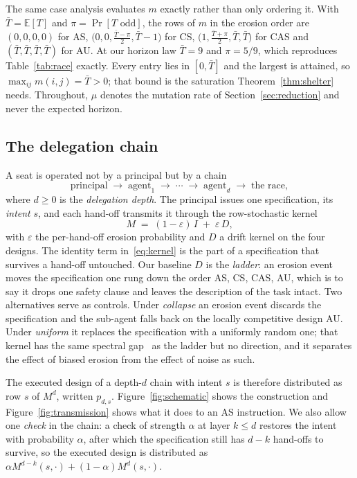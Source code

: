 \documentclass[a4paper,fleqn]{cas-sc}
\newcommand{\AS}{\textsf{AS}}
\newcommand{\CS}{\textsf{CS}}
\newcommand{\CAS}{\textsf{CAS}}
\newcommand{\AU}{\textsf{AU}}
\begin{document}
The same case analysis evaluates $m$ exactly rather than only ordering it. With
$\bar T=\mathbb{E}[T]$ and $\pi=\Pr[T\text{ odd}]$, the rows of $m$ in the
erosion order are $(0,0,0,0)$ for \AS{},
$\bigl(0,0,\tfrac{\bar T-\pi}{2},\bar T-1\bigr)$ for \CS{},
$\bigl(1,\tfrac{\bar T+\pi}{2},\bar T,\bar T\bigr)$ for \CAS{} and
$(\bar T,\bar T,\bar T,\bar T)$ for \AU{}. At our horizon law $\bar T=9$ and
$\pi=5/9$, which reproduces Table~\ref{tab:race} exactly. Every entry lies in
$[0,\bar T]$ and the largest is attained, so $\max_{ij}m(i,j)=\bar T>0$; that
bound is the saturation Theorem~\ref{thm:shelter} needs. Throughout, $\mu$
denotes the mutation rate of Section~\ref{sec:reduction} and never the expected
horizon.

\subsection{The delegation chain}
\label{sec:chain}

A seat is operated not by a principal but by a chain
\[
  \text{principal} \;\longrightarrow\; \text{agent}_1 \;\longrightarrow\;
  \cdots \;\longrightarrow\; \text{agent}_d \;\longrightarrow\; \text{the race},
\]
where $d\ge0$ is the \emph{delegation depth}. The principal issues one
specification, its \emph{intent} $s$, and each hand-off transmits it through
the row-stochastic kernel
\begin{equation}
  M \;=\; (1-\varepsilon)\,I \;+\; \varepsilon\,D,
  \label{eq:kernel}
\end{equation}
with $\varepsilon$ the per-hand-off erosion probability and $D$ a drift kernel
on the four designs. The identity term in~\eqref{eq:kernel} is the part of a
specification that survives a hand-off untouched. Our baseline $D$ is the
\emph{ladder}: an erosion event moves the specification one rung down the order
\AS{}, \CS{}, \CAS{}, \AU{}, which is to say it drops one safety clause and
leaves the description of the task intact. Two alternatives serve as controls.
Under \emph{collapse} an erosion event discards the specification and the
sub-agent falls back on the locally competitive design \AU{}. Under
\emph{uniform} it replaces the specification with a uniformly random one; that
kernel has the same spectral gap~\citep{levin2017markov} as the ladder but no
direction, and it separates the effect of biased erosion from the effect of
noise as such.

The executed design of a depth-$d$ chain with intent $s$ is therefore
distributed as row $s$ of $M^{d}$, written $p_{d,s}$. Figure~\ref{fig:schematic}
shows the construction and Figure~\ref{fig:transmission} shows what it does to
an \AS{} instruction. We also allow one \emph{check} in the chain: a check of
strength $\alpha$ at layer $k\le d$ restores the intent with probability
$\alpha$, after which the specification still has $d-k$ hand-offs to survive,
so the executed design is distributed as
$\alpha M^{d-k}(s,\cdot)+(1-\alpha)M^{d}(s,\cdot)$.
\end{document}

